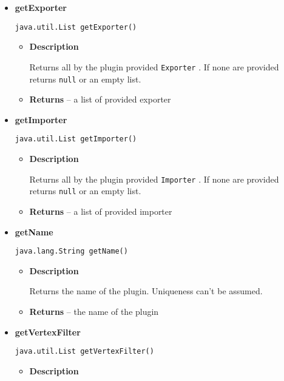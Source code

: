 {{{{{{{{{{\begin{itemize}
{\begin{itemize}
{Returns all by the plugin provided \texttt{\small EdgeFilter}{\small 
{}}. If none are provided returns \texttt{\small null} or an empty list.
}
\item{{\bf  Returns} -- 
the list of provided edge filter 
}%
\end{itemize}
}%
\item{ 
{\bf  getExporter}\\
\begin{lstlisting}[frame=none]
java.util.List getExporter()\end{lstlisting} %
\begin{itemize}
\item{
{\bf  Description}

Returns all by the plugin provided \texttt{\small Exporter}{\small 
{}}. If none are provided returns \texttt{\small null} or an empty list.
}
\item{{\bf  Returns} -- 
a list of provided exporter 
}%
\end{itemize}
}%
\item{ 
{\bf  getImporter}\\
\begin{lstlisting}[frame=none]
java.util.List getImporter()\end{lstlisting} %
\begin{itemize}
\item{
{\bf  Description}

Returns all by the plugin provided \texttt{\small Importer}{\small 
{}}. If none are provided returns \texttt{\small null} or an empty list.
}
\item{{\bf  Returns} -- 
a list of provided importer 
}%
\end{itemize}
}%
\item{ 
{\bf  getName}\\
\begin{lstlisting}[frame=none]
java.lang.String getName()\end{lstlisting} %
\begin{itemize}
\item{
{\bf  Description}

Returns the name of the plugin. Uniqueness can't be assumed.
}
\item{{\bf  Returns} -- 
the name of the plugin 
}%
\end{itemize}
}%
\item{ 
{\bf  getVertexFilter}\\
\begin{lstlisting}[frame=none]
java.util.List getVertexFilter()\end{lstlisting} %
\begin{itemize}
\item{
{\bf  Description}

}
\end{itemize}}
\end{itemize}}}}}}}}}}}
